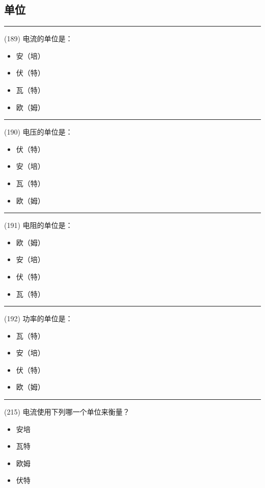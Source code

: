 \documentclass[twocolumn,hyperref,UTF8]{ctexart}  %
\begin{document}
\subsection{单位}


\noindent\rule{0.5\textwidth}{1pt}
\heiti (189) 电流的单位是： \songti {\color{gray} [LK0431] }
\begin{itemize}
	\item  安（培）
	\item  伏（特）
	\item  瓦（特）
	\item  欧（姆）
\end{itemize}


\noindent\rule{0.5\textwidth}{1pt}
\heiti (190) 电压的单位是： \songti {\color{gray} [LK0432] }
\begin{itemize}
	\item  伏（特）
	\item  安（培）
	\item  瓦（特）
	\item  欧（姆）
\end{itemize}


\noindent\rule{0.5\textwidth}{1pt}
\heiti (191) 电阻的单位是： \songti {\color{gray} [LK0433] }
\begin{itemize}
	\item  欧（姆）
	\item  安（培）
	\item  伏（特）
	\item  瓦（特）
\end{itemize}


\noindent\rule{0.5\textwidth}{1pt}
\heiti (192) 功率的单位是： \songti {\color{gray} [LK0434] }
\begin{itemize}
	\item  瓦（特）
	\item  安（培）
	\item  伏（特）
	\item  欧（姆）
\end{itemize}



\noindent\rule{0.5\textwidth}{1pt}
\heiti (215) 电流使用下列哪一个单位来衡量？ \songti {\color{gray} [LK1134] }
\begin{itemize}
	\item  安培
	\item  瓦特
	\item  欧姆
	\item  伏特
\end{itemize}
\end{document}
